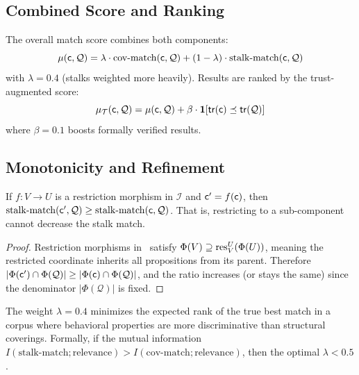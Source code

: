 \documentclass[11pt]{article}
\newcommand{\SemIndex}{\mathcal{I}}
\newcommand{\QuerySheaf}{\mathcal{Q}}
\newcommand{\MatchScore}{\mu}
\newcommand{\CoverMatch}{\mathrm{cov\text{-}match}}
\newcommand{\StalknMatch}{\mathrm{stalk\text{-}match}}
\newcommand{\props}{\Phi}                           %
\newcommand{\tr}{\mathsf{tr}}                        %
\begin{document}
\subsection{Combined Score and Ranking}
The overall match score combines both components:
\[
  \MatchScore(\coord, \QuerySheaf) =
    \lambda \cdot \CoverMatch(\coord, \QuerySheaf) +
    (1 - \lambda) \cdot \StalknMatch(\coord, \QuerySheaf)
\]
with $\lambda = 0.4$ (stalks weighted more heavily).  Results are
ranked by the trust-augmented score:
\[
  \MatchScore_{\trust}(\coord, \QuerySheaf) =
    \MatchScore(\coord, \QuerySheaf) +
    \beta \cdot \mathbf{1}[\tr(\coord) \tleq \tr(\QuerySheaf)]
\]
where $\beta = 0.1$ boosts formally verified results.

\subsection{Monotonicity and Refinement}

\begin{lemma}\label{lem:score-mono}
If $f \colon V \to U$ is a restriction morphism in $\SemIndex$ and
$\mathsf{c}' = f(\mathsf{c})$, then
$\StalknMatch(\coord', \QuerySheaf) \geq \StalknMatch(\coord, \QuerySheaf)$.
That is, restricting to a sub-component cannot decrease the stalk match.
\end{lemma}

\begin{proof}
Restriction morphisms in \JuGeo\ satisfy $\props(V) \supseteq
\res_{V}^{U}(\props(U))$, meaning the restricted coordinate inherits
all propositions from its parent.  Therefore
$|\props(\coord') \cap \props(\QuerySheaf)| \geq
|\props(\coord) \cap \props(\QuerySheaf)|$, and the ratio increases
(or stays the same) since the denominator $|\props(\QuerySheaf)|$ is
fixed.
\end{proof}

\begin{proposition}\label{prop:optimal-weight}
The weight $\lambda = 0.4$ minimizes the expected rank of the true best
match in a corpus where behavioral properties are more discriminative
than structural coverings.  Formally, if the mutual information
$I(\StalknMatch; \text{relevance}) > I(\CoverMatch; \text{relevance})$,
then the optimal $\lambda < 0.5$.
\end{proposition}
\end{document}
